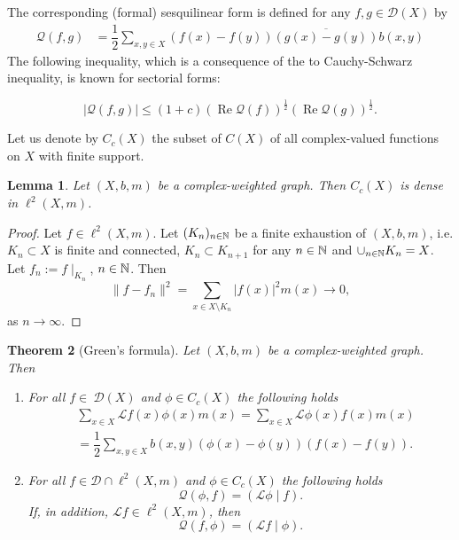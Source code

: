 \documentclass[a4paper,11pt]{amsart}
\newtheorem{theorem}{Theorem}[section]
\newtheorem{lemma}[theorem]{Lemma}
\theoremstyle{definition}
\renewcommand{\Re}{\operatorname{Re}}%
\renewcommand{\L}{\mathcal{L}}
\newcommand{\D}{\mathcal{D}}
\begin{document}
The corresponding (formal) sesquilinear form is defined for any $f,g\in \D(X)$ by
\begin{align*}
\mathcal Q(f,g)&=\dfrac12 \sum_{x,y\in X}{(f(x)-f(y))}\overline{(g(x)-g(y))}b(x,y)
\end{align*}
The following inequality, which is a consequence of the to Cauchy-Schwarz inequality, is known for sectorial forms:

\begin{equation}\label{eq::CSforsect}
|\mathcal Q(f,g)|\le (1+c) \left(\Re \mathcal Q(f)\right)^\frac{1}{2} \left(\Re \mathcal Q(g)\right)^\frac{1}{2}.
\end{equation}



\bigskip
 Let us denote by $C_c(X)$ the subset of $C(X)$ of all complex-valued functions on $X$ with finite support.


\begin{lemma}
Let $(X,b,m)$ be a complex-weighted graph. Then $C_c(X)$ is dense in $\ell^2(X,m)$.
\end{lemma}

\begin{proof}
Let $f\in \ell^2(X,m)$. Let $(K_n)_{n\in \Bbb N}$ be a finite exhaustion of $(X, b, m)$, i.e. $K_n\subset X$ is finite and connected,  $K_{n}\subset K_{n+1}$ for any $n\in \Bbb N$ and $\cup_{n\in \Bbb N} K_n=X$. Let $f_n:=f\mid_{K_n}$, $n\in \Bbb N$. Then
$$
\|f-f_n\|^2=\sum_{x\in X\setminus K_n}|f(x)|^2m(x)\to 0,
$$
as $n\to\infty$.
\end{proof}


\begin{theorem}[Green's formula]
Let $(X,b,m)$ be a complex-weighted graph. Then 
\begin{enumerate}[leftmargin=*]
\item[{\em (a)}]
For all $f\in~\D(X)$ and $\phi \in C_c(X)$ the following holds
\begin{align*}
&\sum_{x\in X}\L f(x) \phi(x) m(x)=\sum_{x\in X}\L \phi(x) f(x)m(x)\\
&=\dfrac{1}{2}\sum_{x,y\in X}b(x,y)(\phi(x)-\phi(y))(f(x)-f(y)).
\end{align*}

\item[{\em (b)}]
For all $f\in \D\cap \ell^2(X,m)$ and $\phi \in C_c(X)$ the following holds
\begin{equation*}
\mathcal Q(\phi, f)=(\L \phi\mid f).
\end{equation*}
If, in addition, $\L f\in  \ell^2(X,m)$, then
\begin{equation*}
\mathcal Q(f,\phi)=( \L f\mid \phi).
\end{equation*}
\end{enumerate}
\end{theorem}
\end{document}
